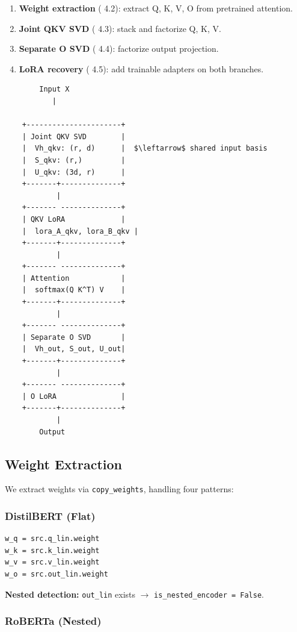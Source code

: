 \begin{enumerate}
\item \textbf{Weight extraction} ( 4.2): extract Q, K, V, O from pretrained attention.
\item \textbf{Joint QKV SVD} ( 4.3): stack and factorize Q, K, V.
\item \textbf{Separate O SVD} ( 4.4): factorize output projection.
\item \textbf{LoRA recovery} ( 4.5): add trainable adapters on both branches.

\end{enumerate}
\begin{lstlisting}
        Input X
           |
            
    +----------------------+
    | Joint QKV SVD        |
    |  Vh_qkv: (r, d)      |  $\leftarrow$ shared input basis
    |  S_qkv: (r,)         |
    |  U_qkv: (3d, r)      |
    +-------+--------------+
            |
    +------- --------------+
    | QKV LoRA             |
    |  lora_A_qkv, lora_B_qkv |
    +-------+--------------+
            |
    +------- --------------+
    | Attention            |
    |  softmax(Q K^T) V    |
    +-------+--------------+
            |
    +------- --------------+
    | Separate O SVD       |
    |  Vh_out, S_out, U_out|
    +-------+--------------+
            |
    +------- --------------+
    | O LoRA               |
    +-------+--------------+
            |
        Output
\end{lstlisting}

\subsection{Weight Extraction}

We extract weights via \texttt{copy\_weights}, handling four patterns:

\subsubsection{DistilBERT (Flat)}

\begin{lstlisting}
w_q = src.q_lin.weight
w_k = src.k_lin.weight
w_v = src.v_lin.weight
w_o = src.out_lin.weight
\end{lstlisting}

\textbf{Nested detection:} \texttt{out\_lin} exists $\to$ \texttt{is\_nested\_encoder = False}.

\subsubsection{RoBERTa (Nested)}

